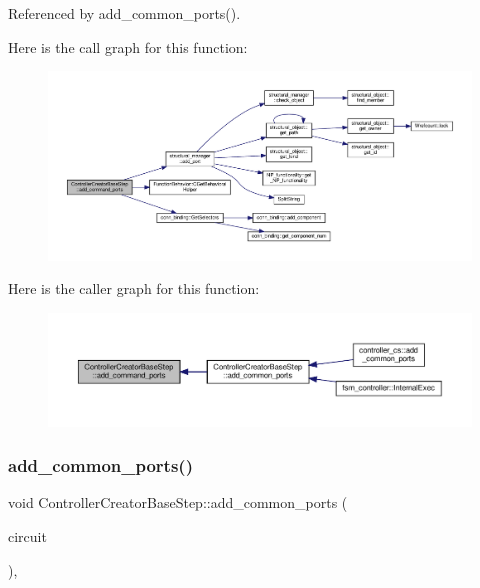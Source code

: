 Referenced by add\+\_\+common\+\_\+ports().

Here is the call graph for this function\+:
\nopagebreak
\begin{figure}[H]
\begin{center}
\leavevmode
\includegraphics[width=350pt]{d5/d28/classControllerCreatorBaseStep_a86b0917636dd8df88f42bb933e448bb9_cgraph}
\end{center}
\end{figure}
Here is the caller graph for this function\+:
\nopagebreak
\begin{figure}[H]
\begin{center}
\leavevmode
\includegraphics[width=350pt]{d5/d28/classControllerCreatorBaseStep_a86b0917636dd8df88f42bb933e448bb9_icgraph}
\end{center}
\end{figure}
\mbox{\label{classControllerCreatorBaseStep_aae1b2e6c9d6c8f5b4e3a7b6a26d1d56a}} 
\subsubsection{\texorpdfstring{add\+\_\+common\+\_\+ports()}{add\_common\_ports()}}
{\footnotesize\ttfamily void Controller\+Creator\+Base\+Step\+::add\+\_\+common\+\_\+ports (\begin{DoxyParamCaption}\item[{\hyperlink{structural__objects_8hpp_a8ea5f8cc50ab8f4c31e2751074ff60b2}{structural\+\_\+object\+Ref}}]{circuit }\end{DoxyParamCaption})\hspace{0.3cm}{\ttfamily [protected]}, {\ttfamily [virtual]}}



